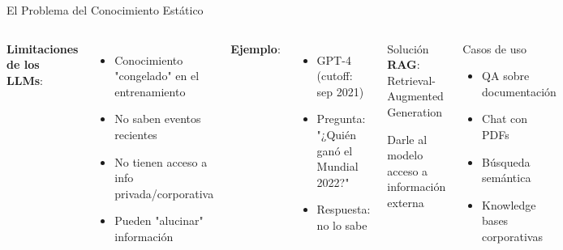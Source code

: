 \begin{frame}{El Problema del Conocimiento Estático}

\begin{columns}
\textbf{Limitaciones de los LLMs}:
\begin{itemize}
    \item Conocimiento "congelado" en el entrenamiento
    \item No saben eventos recientes
    \item No tienen acceso a info privada/corporativa
    \item Pueden "alucinar" información
\end{itemize}

\vspace{0.5em}

\textbf{Ejemplo}:
\begin{itemize}
    \item GPT-4 (cutoff: sep 2021)
    \item Pregunta: "¿Quién ganó el Mundial 2022?"
    \item Respuesta: no lo sabe
\end{itemize}

\begin{alertblock}{Solución}
\textbf{RAG}: Retrieval-Augmented Generation

\vspace{0.3em}
Darle al modelo acceso a información externa
\end{alertblock}

\vspace{0.5em}

\begin{exampleblock}{Casos de uso}
\begin{itemize}
    \item QA sobre documentación
    \item Chat con PDFs
    \item Búsqueda semántica
    \item Knowledge bases corporativas
\end{itemize}
\end{exampleblock}

\end{columns}

\end{frame}

